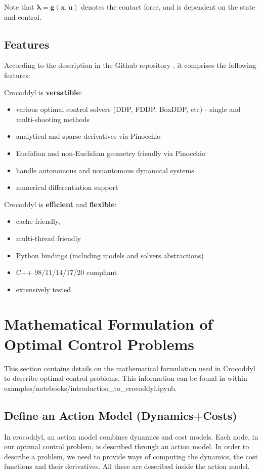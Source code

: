 Note that $\boldsymbol{\lambda}=\mathbf{g}(\mathbf{x},\mathbf{u})$ denotes the contact force, and is dependent on the state and control.

\subsection{Features}
According to the description in the Github repository \cite{crocoddylweb}, it comprises the following features:

Crocoddyl is \textbf{versatible}:
\begin{itemize}
\item various optimal control solvers (DDP, FDDP, BoxDDP, etc) - single and multi-shooting methods
\item analytical and sparse derivatives via Pinocchio
\item Euclidian and non-Euclidian geometry friendly via Pinocchio
\item handle autonomous and nonautomous dynamical systems
\item numerical differentiation support
\end{itemize}

Crocoddyl is \textbf{efficient} and \textbf{flexible}:
\begin{itemize}
\item cache friendly,
\item multi-thread friendly
\item Python bindings (including models and solvers abstractions)
\item C++ 98/11/14/17/20 compliant
\item extensively tested
\end{itemize}


\section{Mathematical Formulation of Optimal Control Problems}
This section contains details on the mathematical formulation used in Crocoddyl to describe optimal control problems. This information can be found in \cite{crocoddylweb} within examples/notebooks/introduction\_to\_crocoddyl.ipynb.
\subsection{Define an Action Model (Dynamics+Costs)}
In crocoddyl, an action model combines dynamics and cost models. Each node, in our optimal control problem, is described through an action model. In order to describe a problem, we need to provide ways of computing the dynamics, the cost functions and their derivatives. All these are described inside the action model.

